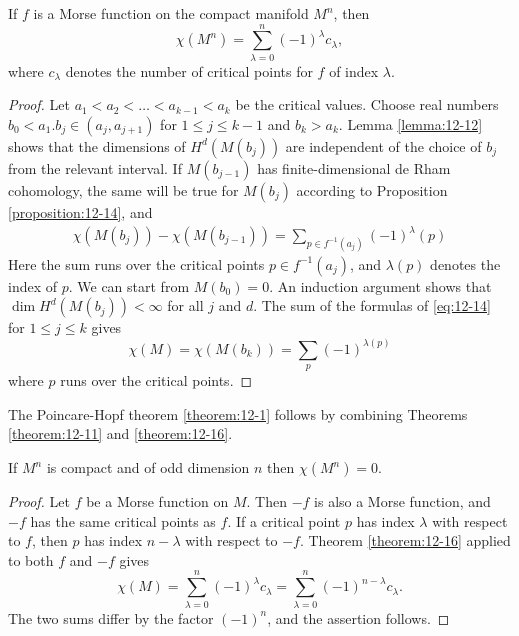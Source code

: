 \begin{theorem}\label{theorem:12-16}
  If $f$ is a Morse function on the compact manifold $M^n$, then
  \[
    \chi(M^n) = \sum_{\lambda=0}^{n }{(-1)^\lambda c_\lambda},
  \]
  where $c_\lambda$ denotes the number of critical points for $f$ of index $\lambda$.
\end{theorem}

\begin{proof}
  Let $a_1 < a_2 < \ldots < a_{k-1} < a_k$ be the critical values. Choose real
  numbers $b_0 < a_1. b_j\in (a_j, a_{j+1})$ for $1\le j\le k-1$ and $b_k > a_k$. 
  Lemma \ref{lemma:12-12} shows that the dimensions of $H^d(M(b_j))$ are independent of 
  the choice of $b_j$ from the relevant interval. If $M(b_{j-1})$ has finite-dimensional de 
  Rham cohomology, the same will be true for $M(b_j)$ according to Proposition \ref{proposition:12-14}, 
  and
  \begin{align}\label{eq:12-14}
    \chi(M(b_j)) - \chi(M(b_{j-1})) = \sum_{p\in f^{-1}(a_j)}^{}{(-1)^\lambda(p)}
  \end{align}
  Here the sum runs over the critical points $p\in f^{-1}(a_j)$, and $\lambda(p)$ 
  denotes the index of $p$. We can start from $M(b_0) = 0$. An induction argument shows that
  $\dim H^d(M(b_j))<\infty$ for all $j$ and $d$. The sum of the formulas of \eqref{eq:12-14} for
  $1\le j\le k$ gives
  \[
    \chi(M) = \chi(M(b_k))
    = \sum_{p }^{}{(-1)^{\lambda(p)}}
  \]
  where $p$ runs over the critical points.
\end{proof}

The Poincare-Hopf theorem \ref{theorem:12-1} follows by combining Theorems \ref{theorem:12-11} 
and \ref{theorem:12-16}.


\begin{corollary}\label{corollary:12-17}
  If $M^n$ is compact and of odd dimension $n$ then $\chi(M^n) = 0$.
\end{corollary}

\begin{proof}
  Let $f$ be a Morse function on $M$. Then $-f$ is also a Morse function,
  and $-f$ has the same critical points as $f$. If a critical point $p$ has index $\lambda$ with
  respect to $f$, then $p$ has index $n-\lambda$ with respect to $-f$. Theorem \ref{theorem:12-16} applied
  to both $f$ and $-f$ gives
  \[
    \chi(M) 
    = \sum_{\lambda=0}^{n }{(-1)^\lambda c_\lambda}
    = \sum_{\lambda=0}^{n }{(-1)^{n-\lambda}c_{\lambda}}.
  \]
  The two sums differ by the factor $(-1)^n$, and the assertion follows.
\end{proof}


